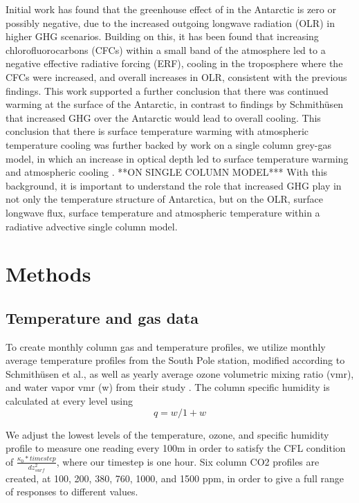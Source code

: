 \documentclass[12]{article}
\begin{document}
Initial work has found that the greenhouse effect of  in the Antarctic is zero or possibly negative, due to the increased outgoing longwave radiation (OLR) in higher GHG scenarios\citep{schmithusen_how_2015}. Building on this, it has been found that increasing chlorofluorocarbons (CFCs) within a small band of the atmosphere led to a negative effective radiative forcing (ERF), cooling in the troposphere where the CFCs were increased, and overall increases in OLR, consistent with the previous findings. This work supported a further conclusion that there was continued warming at the surface of the Antarctic, in contrast to findings by Schmithüsen that increased GHG over the Antarctic would lead to overall cooling. This conclusion that there is surface temperature warming with atmospheric temperature cooling was further backed by work on a single column grey-gas model, in which an increase in optical depth led to surface temperature warming and atmospheric cooling \citep{payne_conceptual_2015}.
**ON SINGLE COLUMN MODEL***
With this background, it is important to understand the role that increased GHG play in not only the temperature structure of Antarctica, but on the OLR, surface longwave flux, surface temperature and atmospheric temperature within a radiative advective single column model. 


\section{Methods}
\subsection{Temperature and gas data}
 To create monthly column gas and temperature profiles, we utilize monthly average temperature profiles from the South Pole station, modified according to Schmithüsen et al., as well as yearly average ozone volumetric mixing ratio (vmr), and water vapor vmr (w) from their study  \citep{schmithusen_how_2015}. The column specific humidity is calculated at every level using
\begin{equation}
    q = w/1+w
\end{equation}

 We adjust the lowest levels of the temperature, ozone, and specific humidity profile to measure one reading every 100m in order to satisfy the CFL condition of $\frac{\kappa_0*timestep}{dz^2_{surf}}$, where our timestep is one hour. Six column CO2 profiles are created, at 100, 200, 380, 760, 1000, and 1500 ppm, in order to give a full range of responses to different values. 
\end{document}
